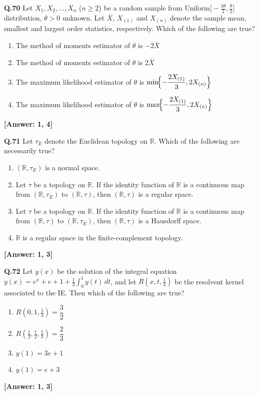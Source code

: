 \documentclass[12pt,a4paper]{article}
\newcommand{\ans}[1]{\quad\textcolor{anscolor}{\textbf{[Answer: #1]}}}
\begin{document}
\textbf{Q.70} Let $X_1,X_2,\ldots,X_n$ ($n\ge2$) be a random sample from Uniform$\!\bigl[-\tfrac{3\theta}{2},\tfrac{\theta}{2}\bigr]$ distribution, $\theta>0$ unknown. Let $\bar{X}$, $X_{(1)}$ and $X_{(n)}$ denote the sample mean, smallest and largest order statistics, respectively. Which of the following are true?
\begin{enumerate}[label=\arabic*.]
\item The method of moments estimator of $\theta$ is $-2\bar{X}$
\item The method of moments estimator of $\theta$ is $2\bar{X}$
\item The maximum likelihood estimator of $\theta$ is $\min\!\Bigl\{-\dfrac{2X_{(1)}}{3},2X_{(n)}\Bigr\}$
\item The maximum likelihood estimator of $\theta$ is $\max\!\Bigl\{-\dfrac{2X_{(1)}}{3},2X_{(n)}\Bigr\}$
\end{enumerate}\ans{1, 4}

\textbf{Q.71} Let $\tau_E$ denote the Euclidean topology on $\mathbb{R}$. Which of the following are necessarily true?
\begin{enumerate}[label=\arabic*.]
\item $(\mathbb{R},\tau_E)$ is a normal space.
\item Let $\tau$ be a topology on $\mathbb{R}$. If the identity function of $\mathbb{R}$ is a continuous map from $(\mathbb{R},\tau_E)$ to $(\mathbb{R},\tau)$, then $(\mathbb{R},\tau)$ is a regular space.
\item Let $\tau$ be a topology on $\mathbb{R}$. If the identity function of $\mathbb{R}$ is a continuous map from $(\mathbb{R},\tau)$ to $(\mathbb{R},\tau_E)$, then $(\mathbb{R},\tau)$ is a Hausdorff space.
\item $\mathbb{R}$ is a regular space in the finite-complement topology.
\end{enumerate}\ans{1, 3}

\textbf{Q.72} Let $y(x)$ be the solution of the integral equation $y(x)=e^x+e+1+\tfrac{1}{3}\int_0^1y(t)\,dt$, and let $R\!\left(x,t,\tfrac{1}{3}\right)$ be the resolvent kernel associated to the IE. Then which of the following are true?
\begin{enumerate}[label=\arabic*.]
\item $R\!\left(0,1,\tfrac{1}{3}\right)=\dfrac{3}{2}$ \item $R\!\left(\tfrac{1}{2},\tfrac{1}{2},\tfrac{1}{3}\right)=\dfrac{2}{3}$
\item $y(1)=3e+1$ \item $y(1)=e+3$
\end{enumerate}\ans{1, 3}
\end{document}
